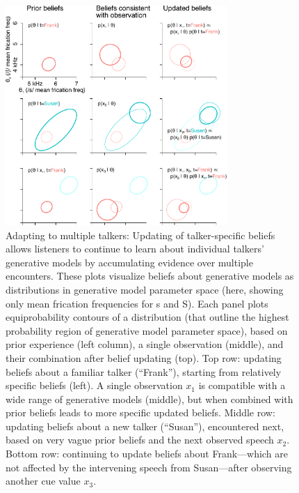 \begin{figure}[!htb]
  \centering
  \includegraphics[width=0.75\textwidth]{part2-schematics/talker-specific-belief-updating-annotated.pdf}
  \caption{Adapting to multiple talkers: Updating of talker-specific beliefs allows listeners to continue to learn about individual talkers' generative models by accumulating evidence over multiple encounters.  These plots visualize beliefs about generative models as distributions in generative model parameter space (here, showing only mean frication frequencies for \ph s and \ph S).  Each panel plots equiprobability contours of a distribution (that outline the highest probability region of generative model parameter space), based on prior experience (left column), a single observation (middle), and their combination after belief updating (top).  Top row: updating beliefs about a familiar talker (``Frank''), starting from relatively specific beliefs (left).  A single observation $x_1$ is compatible with a wide range of generative models (middle), but when combined with prior beliefs leads to more specific updated beliefs.  Middle row: updating beliefs about a new talker (``Susan''), encountered next, based on very vague prior beliefs and the next observed speech $x_2$.  Bottom row: continuing to update beliefs about Frank---which are not affected by the intervening speech from Susan---after observing another cue value $x_3$.}
  \label{fig:talker-specific-belief-updating}
\end{figure}

